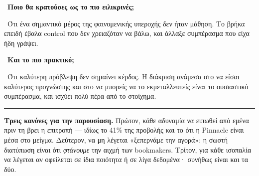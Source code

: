 \documentclass[11pt,a4paper]{article}
\newcommand{\qa}[2]{%
  \par\medskip\noindent{\color{qcol}\textbf{Ε.}}\ \textbf{#1}\par
  \noindent{\color{qcol}\textbf{Α.}}\ #2\par}
\begin{document}
\qa{Ποιο θα κρατούσες ως το πιο ειλικρινές;}
{Ότι ένα σημαντικό μέρος της φαινομενικής υπεροχής δεν ήταν μάθηση. Το βρήκα επειδή έβαλα
control που δεν χρειαζόταν να βάλω, και άλλαξε συμπέρασμα που είχα ήδη γράψει.}

\qa{Και το πιο πρακτικό;}
{Ότι καλύτερη πρόβλεψη δεν σημαίνει κέρδος. Η διάκριση ανάμεσα στο να είσαι καλύτερος
προγνώστης και στο να μπορείς να το εκμεταλλευτείς είναι το ουσιαστικό συμπέρασμα, και
ισχύει πολύ πέρα από το στοίχημα.}

\vspace{1.5em}
\hrule
\vspace{0.8em}
{\small
\textbf{Τρεις κανόνες για την παρουσίαση.} Πρώτον, κάθε αδυναμία να ειπωθεί από εμένα πριν
τη βρει η επιτροπή --- ιδίως το 41\% της προβολής και το ότι η Pinnacle είναι μέσα στο
μείγμα. Δεύτερον, να μη λέγεται «ξεπερνάμε την αγορά»: η σωστή διατύπωση είναι ότι
\emph{φτάνουμε} την αιχμή των bookmakers. Τρίτον, για κάθε ισοπαλία να λέγεται αν οφείλεται
σε ίδια ποιότητα ή σε λίγα δεδομένα· συνήθως είναι και τα δύο.
}
\end{document}
